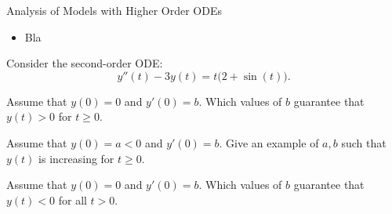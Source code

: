 %
%



\begin{module}{Analysis of Models with Higher Order ODEs}
	\label{2nd:analysis}

	
	
\end{module}



\begin{lesson}

	\begin{itemize}
		\item Bla
	\end{itemize}
	

\end{lesson}




\newpage

\question
	Consider the second-order ODE:
	$$
	y''(t) - 3y(t) = t \big( 2 + \sin(t) \big).
	$$
	
	\begin{parts}
		\item Assume that $y(0)=0$ and $y'(0)=b$. Which values of $b$ guarantee that $y(t)>0$ for $t\geq 0$. 
		\item Assume that $y(0)=a<0$ and $y'(0)=b$. Give an example of $a,b$ such that $y(t)$ is increasing for $t\geq 0$. 
		\item Assume that $y(0)=0$ and $y'(0)=b$. Which values of $b$ guarantee that $y(t)<0$ for all $t>0$.

%

	\end{parts}

